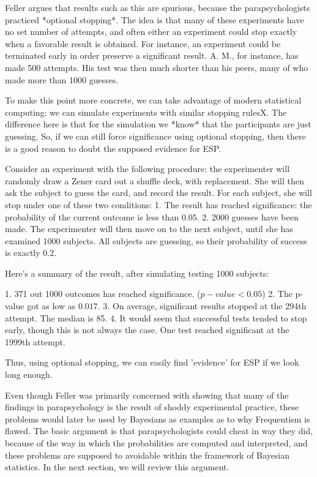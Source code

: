 Feller argues that results such as this are spurious, because the
parapsychologists practiced *optional stopping*. The idea is that many
of these experiments have no set number of attempts, and often either an
experiment could stop exactly when a favorable result is obtained. For
instance, an experiment could be terminated early in order preserve a
significant result. A. M., for instance, has made 500 attempts. His test
was then much shorter than his peers, many of who made more than 1000
guesses.

To make this point more concrete, we can take advantage of modern
statistical computing: we can simulate experiments with similar stopping
rulesX. The difference here is that for the simulation we *know* that
the participants are just guessing. So, if we can still force
significance using optional stopping, then there is a good reason to
doubt the supposed evidence for ESP.

Consider an experiment with the following procedure: the experimenter
will randomly draw a Zener card out a shuffle deck, with replacement.
She will then ask the subject to guess the card, and record the result.
For each subject, she will stop under one of these two conditions: 1.
The result has reached significance: the probability of the current
outcome is less than \(0.05\). 2. 2000 guesses have been made. The
experimenter will then move on to the next subject, until she has
examined 1000 subjects. All subjects are guessing, so their probability
of success is exactly \(0.2\).

Here's a summary of the result, after simulating testing 1000 subjects:

1. 371 out 1000 outcomes has reached significance. (\(p-value<0.05\)) 2.
The p-value got as low as \(0.017\). 3. On average, significant results
stopped at the 294th attempt. The median is 85. 4. It would seem that
successful tests tended to stop early, though this is not always the
case. One test reached significant at the 1999th attempt.

Thus, using optional stopping, we can easily find 'evidence' for ESP if
we look long enough.

Even though Feller was primarily concerned with showing that many of the
findings in parapsychology is the result of shoddy experimental
practice, these problems would later be used by Bayesians as examples as
to why Frequentism is flawed. The basic argument is that
parapsychologists could cheat in way they did, because of the way in
which the probabilities are computed and interpreted, and these problems
are supposed to avoidable within the framework of Bayesian statistics.
In the next section, we will review this argument.

